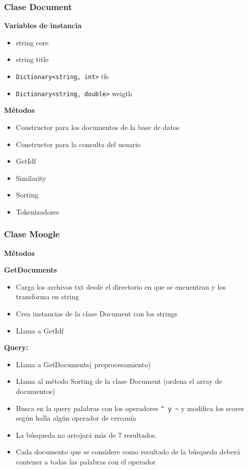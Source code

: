 \documentclass{beamer}
\begin{document}
  \begin{frame}[fragile] 
	\frametitle{ Clase Document}
	
	\textbf{Variables de instancia}
	\begin{itemize}
		\item string core
		\item string title
		\item \verb|Dictionary<string, int>| tfs             
		\item \verb|Dictionary<string, double>| weigth   
	\end{itemize}



  \textbf{M\'etodos}
  \begin{itemize}
  	\item Constructor para los documentos de la base de datos
  	\item Constructor para la consulta del usuario
  	\item GetIdf
  	\item Similarity
  	\item Sorting
  	\item Tokenizadores
  \end{itemize}

  \end{frame}


  \begin{frame}[fragile]
	\frametitle{Clase Moogle}
	\textbf{M\'etodos}


   \textbf{	GetDocuments}
	\begin{itemize}
		\item Carga los archivos txt desde el directorio en que se encuentran y los transforma en string
		\item Crea instancias de la clase Document con los strings
		\item Llama a GetIdf
	\end{itemize}

    \textbf{Query:}
   \begin{itemize}
   	\item Llama a GetDocuments( preprocesamiento)
   	\item Llama al m\'etodo Sorting de la clase Document (ordena el array de documentos)
   	\item Busca en la query palabras con los operadores \verb|^ y ~|  y modifica los scores seg\'un halla alg\'un operador de cercan\'ia
   	\item La b\'usqueda no arrojar\'a m\'as de 7 resultados. 
   	\item Cada documento que se considere como resultado de la b\'usqueda deber\'a contener a todas las palabras con el operador 
  \end{itemize}

  \end{frame}
\end{document}
